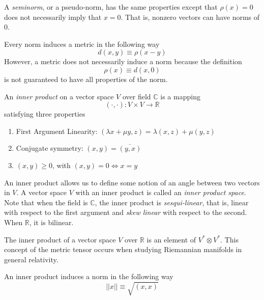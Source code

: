 \documentclass{article}
\begin{document}
  \begin{definition}
    A \textit{seminorm}, or a pseudo-norm, has the same properties except that $\rho(x) = 0$ does not necessarily imply that $x = 0$. That is, nonzero vectors can have norms of $0$. 
  \end{definition}

  \begin{proposition}
    Every norm induces a metric in the following way
    \begin{equation}
      d(x, y) \equiv \rho(x-y)
    \end{equation}
    However, a metric does not necessarily induce a norm because the definition
    \begin{equation}
      \rho(x) \equiv d(x, 0)
    \end{equation}
    is not guaranteed to have all properties of the norm. 
  \end{proposition}

  \begin{definition}
    An \textit{inner product} on a vector space $V$ over field $\mathbb{C}$ is a mapping 
    \begin{equation}
      (\cdot, \cdot): V \times V \longrightarrow \mathbb{R}
    \end{equation}
    satisfying three properties 
    \begin{enumerate}
      \item First Argument Linearity: $(\lambda x + \mu y, z) = \lambda (x, z) + \mu (y, z)$
      \item Conjugate symmetry: $(x, y) = \bar{(y, x)}$
      \item $(x, y) \geq 0$, with $(x, y) = 0 \iff x = y$
    \end{enumerate}
    An inner product allows us to define some notion of an angle between two vectors in $V$. A vector space $V$ with an inner product is called an \textit{inner product space}. Note that when the field is $\mathbb{C}$, the inner product is \textit{sesqui-linear}, that is, linear with respect to the first argument and \textit{skew linear} with respect to the second. When $\mathbb{R}$, it is bilinear. 
  \end{definition}

  The inner product of a vector space $V$ over $\mathbb{R}$ is an element of $V^* \otimes V^*$. This concept of the metric tensor occurs when studying Riemannian manifolds in general relativity. 

  \begin{definition}
    An inner product induces a norm in the following way
    \begin{equation}
      ||x|| \equiv \sqrt{(x,x)} 
    \end{equation}
  \end{definition}
\end{document}
